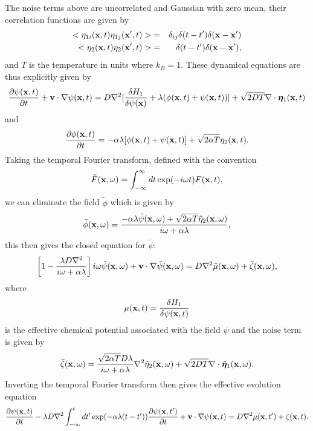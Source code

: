 The noise terms above 
are uncorrelated and Gaussian with zero mean, their correlation functions are given by
\begin{eqnarray}
< \eta_{1i}({\bf x},t) \eta_{1j}({\bf x}',t)>&=& \delta_{ij}\delta(t-t') \delta({\bf x}-{\bf x}') \\
< \eta_{2}({\bf x},t) \eta_{2}({\bf x}',t)>&=& \delta(t-t') \delta({\bf x}-{\bf x}') ,
\end{eqnarray}
and $T$ is the temperature in units where $k_B=1$.
These dynamical equations  are thus explicitly given by
\begin{equation}
    \frac{\partial \psi({\bf x},t)}{\partial t} +{\bf v}\cdot { \nabla}\psi({\bf x},t)= D\nabla^2[\frac{\delta H_1}{\delta \psi({\bf x})}+\lambda(\phi({\bf x},t) + \psi({\bf x},t))]+ \sqrt{2D T}\nabla \cdot {\boldsymbol \eta}_1({\bf x},t)
\end{equation}
and
\begin{equation}
    \frac{\partial \phi({\bf x},t)}{\partial t} = -\alpha\lambda[\phi({\bf x},t) + \psi({\bf x},t)]+ \sqrt{2\alpha T}{ \eta}_2({\bf x},t).
\end{equation}
Taking the temporal Fourier transform, defined with the convention
\begin{equation}
    \tilde F({\bf x}, \omega) = \int_{-\infty}^\infty dt \exp(-i\omega t)F({\bf x}, t),
\end{equation}
we can eliminate the field $\tilde \phi$ which is given by
\begin{equation}
    \tilde \phi({\bf x},\omega) = \frac{-\alpha\lambda \tilde \psi({\bf x},\omega)+\sqrt{2\alpha T}\tilde \eta_2({\bf x},\omega)}{i\omega +\alpha \lambda},
\end{equation}
this then gives the closed equation for $\tilde \psi$:
\begin{equation}
    \left[1-\frac{\lambda D \nabla^2}{i\omega+\alpha\lambda}\right]i\omega \tilde\psi({\bf x}, \omega) +{\bf v}\cdot\nabla\tilde\psi({\bf x}, \omega)
= D\nabla^2 \tilde \mu({\bf x},\omega) +  \tilde \zeta({\bf x},\omega),
\end{equation}
where 
\begin{equation}
    \mu({\bf x},t)=\frac{\delta H_1}{\delta \psi({\bf x},t)}
\end{equation}
is the effective chemical potential associated with the field $\psi$ and the noise term is given by
\begin{equation}
    \tilde \zeta({\bf x},\omega) = \frac{\sqrt{2\alpha T}D\lambda}{i\omega + \alpha\lambda}\nabla^2\tilde \eta_2({\bf x},\omega) +
\sqrt{2DT}\nabla\cdot\tilde {\bm \eta}_1({\bf x},\omega).
\end{equation}
Inverting the temporal Fourier transform then gives the effective evolution equation
\begin{equation}
    \frac{\partial \psi({\bf x},t)}{\partial t} -\lambda D\nabla^2\int_{-\infty}^t dt'
\exp(-\alpha\lambda(t-t')) \frac{\partial \psi({\bf x},t')}{\partial t}+{\bf v}\cdot\nabla\psi({\bf x}, t)=D\nabla^2  \mu({\bf x},t') +  \zeta({\bf x},t).\label{dyn1}
\end{equation}

